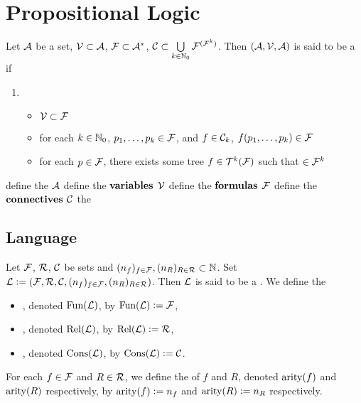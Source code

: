 \documentclass{book}
\begin{document}
	\newpage
	
	
	\chapter{Propositional Logic}
	\begin{defn} 
		Let $\mathcal{A}$ be a set, $\mathcal{V} \subset \mathcal{A}$, $\mathcal{F} \subset \mathcal{A}^*$, $\mathcal{C} \subset \bigcup\limits_{k \in \mathbb{N}_0} \mathcal{F}^{(\mathcal{F}^k)}$. Then $(\mathcal{A}, \mathcal{V}, \mathcal{A})$ is said to be a  
		if 
		\begin{enumerate}
			\item 
			\begin{itemize}
				\item $\mathcal{V} \subset \mathcal{F}$
				\item for each $k \in \mathbb{N}_0$, $p_1, \ldots, p_k \in \mathcal{F}$, and $f \in \mathcal{C}_k$, $f(p_1, \ldots, p_k) \in \mathcal{F}$
				\item for each $p \in \mathcal{F}$, there exists some tree $f \in \mathcal{T}^k(\mathcal{F})$ such that $ \in \mathcal{F}^{k}$ 
			\end{itemize}
		\end{enumerate}
		define the  $\mathcal{A}$
		define the $\textbf{variables}$ $\mathcal{V}$
		define the $\textbf{formulas}$ $\mathcal{F}$
		define the $\textbf{connectives}$ $\mathcal{C}$
		the 
	\end{defn}
	
	\begin{ex}
		
	\end{ex}
	
	
	
	
	
	
	
	
	
	
	
	
	
	
	
	
	
	
	\newpage
	
	\section{Language}
	
	\begin{defn}
		Let $\mathcal{F}$, $\mathcal{R}$, $\mathcal{C}$ be sets and $(n_f)_{f \in \mathcal{F}}, (n_R)_{R \in \mathcal{R}} \subset \mathbb{N}$. Set $\mathcal{L} \vcentcolon= (\mathcal{F}, \mathcal{R}, \mathcal{C}, (n_f)_{f \in \mathcal{F}}, (n_R)_{R \in \mathcal{R}})$. Then $\mathcal{L}$ is said to be a \tbf{language}. 
		We define the 
		\begin{itemize}
			\item {}, denoted $\operatorname*{\text{Fun}}(\mathcal{L})$, by $\operatorname*{\text{Fun}}(\mathcal{L}) \vcentcolon= \mathcal{F}$,
			\item {}, denoted $\operatorname*{\text{Rel}}(\mathcal{L})$, by $\operatorname*{\text{Rel}}(\mathcal{L}) \vcentcolon= \mathcal{R}$,
			\item {}, denoted $\operatorname*{\text{Cons}}(\mathcal{L})$, by $\operatorname*{\text{Cons}}(\mathcal{L}) \vcentcolon= \mathcal{C}$.
		\end{itemize}
		For each $f \in \mathcal{F}$ and $R \in \mathcal{R}$, we define the  of $f$ and $R$, denoted $\operatorname*{\text{arity}}(f)$ and $\operatorname*{\text{arity}}(R)$ respectively, by $\operatorname*{\text{arity}}(f) \vcentcolon= n_f$ and $\operatorname*{\text{arity}}(R) \vcentcolon= n_R$ respectively.
	\end{defn}
\end{document}
